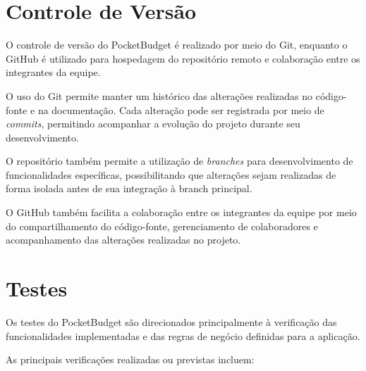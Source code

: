 \documentclass[12pt,a4paper]{article}
\begin{document}
\section{Controle de Versão}

O controle de versão do PocketBudget é realizado por meio do Git, enquanto o GitHub é utilizado para hospedagem do repositório remoto e colaboração entre os integrantes da equipe.

O uso do Git permite manter um histórico das alterações realizadas no código-fonte e na documentação. Cada alteração pode ser registrada por meio de \textit{commits}, permitindo acompanhar a evolução do projeto durante seu desenvolvimento.

O repositório também permite a utilização de \textit{branches} para desenvolvimento de funcionalidades específicas, possibilitando que alterações sejam realizadas de forma isolada antes de sua integração à branch principal.

O GitHub também facilita a colaboração entre os integrantes da equipe por meio do compartilhamento do código-fonte, gerenciamento de colaboradores e acompanhamento das alterações realizadas no projeto.

\section{Testes}

Os testes do PocketBudget são direcionados principalmente à verificação das funcionalidades implementadas e das regras de negócio definidas para a aplicação.

As principais verificações realizadas ou previstas incluem:
\end{document}

